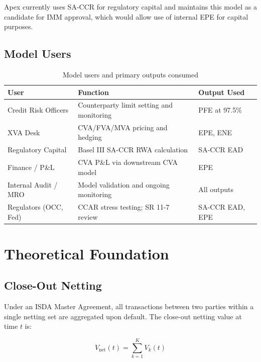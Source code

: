 \documentclass[11pt,a4paper]{article}
\begin{document}
Apex currently uses SA-CCR for regulatory capital and maintains this model as
a candidate for IMM approval, which would allow use of internal EPE for
capital purposes.

\subsection{Model Users}

\begin{table}[h!]
\centering
\begin{tabular}{@{}lll@{}}
\toprule
\textbf{User} & \textbf{Function} & \textbf{Output Used} \\
\midrule
Credit Risk Officers   & Counterparty limit setting and monitoring & PFE at 97.5\% \\
XVA Desk               & CVA/FVA/MVA pricing and hedging           & EPE, ENE \\
Regulatory Capital     & Basel III SA-CCR RWA calculation          & SA-CCR EAD \\
Finance / P\&L         & CVA P\&L via downstream CVA model         & EPE \\
Internal Audit / MRO   & Model validation and ongoing monitoring   & All outputs \\
Regulators (OCC, Fed)  & CCAR stress testing; SR 11-7 review       & SA-CCR EAD, EPE \\
\bottomrule
\end{tabular}
\caption{Model users and primary outputs consumed}
\end{table}

\section{Theoretical Foundation}
\label{sec:theory}

\subsection{Close-Out Netting}

Under an ISDA Master Agreement, all transactions between two parties within a
single netting set are aggregated upon default. The close-out netting value at
time $t$ is:

\begin{equation}
  V_{\text{net}}(t) = \sum_{k=1}^{K} V_k(t)
  \label{eq:netting}
\end{equation}
\end{document}
